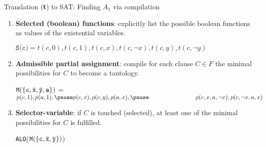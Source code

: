 \documentclass[xcolor=table	]{beamer}
\newcommand{\ov}[1]{\mkern 1.5mu\overline{\mkern-1.5mu#1\mkern-1.5mu}\mkern 1.5mu}
\begin{document}
\begin{frame}{Translation (\textbf{t}) to SAT: Finding $A_1$ via compilation}
\begin{enumerate}
    \item \textbf{Selected (boolean) functions}: 
    explicitly list the possible boolean functions as values of the existential variables. \newline
 
    $\texttt{S(c)} = t(c, 0) , t(c, 1), t(c, x), t(c, \neg x), t(c, y), t(c, \neg y)$	 \newline 

   \pause   
  
    \item\textbf{Admissible partial assignment}:
    compile for each clause $C \in F$ the minimal possibilities
    for $C$ to become a tautology. \newline 
    
    $\texttt{M} (\{\texttt{c},\ov{\texttt{x}},\ov{\texttt{y}}, \texttt{a}\})$ = 
    $p(c, 1) , p(a, 1),
    \pause 
    p(c, x), p(c, y), p(a, x), \newline 
    \pause 
   \hspace{2.75cm} p(c, x, a, \neg x), p(c, \neg x, a, x) $ \newline 
    \pause
    \item \textbf{Selector-variable}: if $C$ is touched (selected), at least one of the minimal possibilities for $C$ is fulfilled. \newline 
    
    \texttt{ALO}($\texttt{M} (\{\texttt{c},\ov{\texttt{x}},\ov{\texttt{y}} \})$)
\end{enumerate}

\end{frame}
\end{document}
